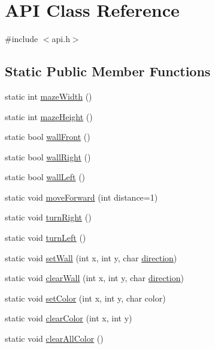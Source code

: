 \hypertarget{class_a_p_i}{}\section{A\+PI Class Reference}
\label{class_a_p_i}


{\ttfamily \#include $<$api.\+h$>$}

\subsection*{Static Public Member Functions}
\begin{DoxyCompactItemize}
\item 
static int \hyperlink{class_a_p_i_aad4f60e45d012af3985946b3a3bd561c}{maze\+Width} ()
\item 
static int \hyperlink{class_a_p_i_ae356a8b8b3090ec8e5e66fb9d7e827a6}{maze\+Height} ()
\item 
static bool \hyperlink{class_a_p_i_a3452beb4232e7960ffdb8c0d4a1f0d30}{wall\+Front} ()
\item 
static bool \hyperlink{class_a_p_i_acdc812c3acadeb2890691e6c95a89816}{wall\+Right} ()
\item 
static bool \hyperlink{class_a_p_i_a43b1e7f9b91aba577078af681c7807b3}{wall\+Left} ()
\item 
static void \hyperlink{class_a_p_i_a25ace37c644938df32f6dae69abfe052}{move\+Forward} (int distance=1)
\item 
static void \hyperlink{class_a_p_i_a4b5aaf5e3e061474d84191ab9ee05d63}{turn\+Right} ()
\item 
static void \hyperlink{class_a_p_i_af04ee9209026f2a6e1c502e6c900573f}{turn\+Left} ()
\item 
static void \hyperlink{class_a_p_i_a9b0b04cf1cfc62ae6f5eef1ac1729eb2}{set\+Wall} (int x, int y, char \hyperlink{util_8h_a99f26e6ee9fcd62f75203b5402df8098}{direction})
\item 
static void \hyperlink{class_a_p_i_a3178d408a832d81500847ca62ce1f509}{clear\+Wall} (int x, int y, char \hyperlink{util_8h_a99f26e6ee9fcd62f75203b5402df8098}{direction})
\item 
static void \hyperlink{class_a_p_i_aee5aaa673b406ddaab3310fcb3a51d83}{set\+Color} (int x, int y, char color)
\item 
static void \hyperlink{class_a_p_i_ae5c04edd8e44f455ac6bf8a19c2ba282}{clear\+Color} (int x, int y)
\item 
static void \hyperlink{class_a_p_i_a26cc8c35d6c492fc782647b7e347525e}{clear\+All\+Color} ()
\item 

\end{DoxyCompactItemize}
